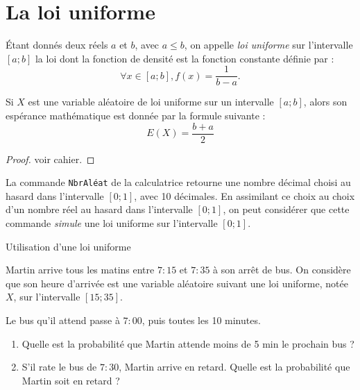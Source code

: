 \section{La loi uniforme}\label{la-loi-uniforme}

\begin{definition}{}
 
Étant donnés deux réels \(a\) et \(b\), avec \(a\leqslant b\), on
appelle \emph{loi uniforme} sur l'intervalle \([a;b]\) la loi dont la
fonction de densité est la fonction constante définie par :
\[\forall x\in [a;b], f(x)=\frac{1}{b-a}.\]

\end{definition}

\vspace{.5cm}

\begin{theoreme}{}
 
Si \(X\) est une variable aléatoire de loi uniforme sur un intervalle
\([a;b]\), alors son espérance mathématique est donnée par la formule
suivante : \[E(X)=\frac{b+a}{2}\]

\end{theoreme}

\begin{proof}
 voir cahier.
\end{proof}


\begin{remarque}
 
La commande \texttt{NbrAléat} de la calculatrice retourne une nombre
décimal choisi au hasard dans l'intervalle \([0;1]\), avec 10 décimales.
En assimilant ce choix au choix d'un nombre réel au hasard dans
l'intervalle \([0;1]\), on peut considérer que cette commande
\emph{simule} une loi uniforme sur l'intervalle \([0;1]\).

\end{remarque}

\vspace{.5cm}

\begin{methode}{Utilisation d'une loi uniforme}

Martin arrive tous les matins entre $7:15$ et $7:35$ à son arrêt de bus. On
considère que son heure d'arrivée est une variable aléatoire suivant une
loi uniforme, notée \(X\), sur l'intervalle \([15;35]\).

Le bus qu'il attend passe à $7:00$, puis toutes les 10 minutes.

\begin{enumerate}
\def\labelenumi{\arabic{enumi}.}
\itemsep1pt\parskip0pt
\item
  Quelle est la probabilité que Martin attende moins de 5 min le
  prochain bus ?
\item
  S'il rate le bus de $7:30$, Martin arrive en retard. Quelle est la
  probabilité que Martin soit en retard ?
\end{enumerate}

\end{methode}

